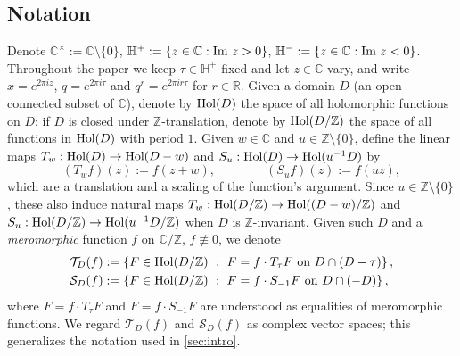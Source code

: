 \documentclass[reqno,11pt]{amsart}
\theoremstyle{definition}
\theoremstyle{remark}
\numberwithin{equation}{section}
\newcommand{\Z}{\mathbb{Z}}
\newcommand{\R}{\mathbb{R}}
\newcommand{\C}{\mathbb{C}}
\renewcommand{\H}{{\mathbb{H}}}
\newcommand{\mT}{\mathcal{T}}
\newcommand{\mS}{\mathcal{S}}
\renewcommand{\Im}{\textnormal{Im}\ }
\newcommand{\Hol}{\textnormal{Hol}}
\begin{document}
\subsection{Notation} \label{subsec:notation}
Denote $\C^\times := \C \setminus \{0\}$, $\H^+ := \{z \in \C : \Im z > 0\}$, $\H^- := \{z \in \C : \Im z < 0\}$. Throughout the paper we keep $\tau \in \H^+$ fixed and let $z \in \C$ vary, and write $x = e^{2\pi i z}$, $q = e^{2\pi i \tau}$ and $q^r = e^{2\pi i r \tau}$ for $r \in \R$. Given a domain $D$ (an open connected subset of $\C$), denote by $\Hol(D)$ the space of all holomorphic functions on $D$; if $D$ is closed under $\Z$-translation, denote by $\Hol(D/\Z)$ the space of all functions in $\Hol(D)$ with period $1$. Given $w \in \C$ and $u \in \Z \setminus \{0\}$, define the linear maps $T_w : \Hol(D) \to \Hol(D - w)$ and $S_u : \Hol(D) \to \Hol(u^{-1} D)$ by
\[
    (T_w f)(z) := f(z+w), \qquad\qquad (S_u f)(z) := f(u z),
\]
which are a translation and a scaling of the function's argument. Since $u \in \Z \setminus \{0\}$, these also induce natural maps $T_w : \Hol(D/\Z) \to \Hol((D-w)/\Z)$ and $S_u : \Hol(D/\Z) \to \Hol(u^{-1}D/\Z)$ when $D$ is $\Z$-invariant. Given such $D$ and a \emph{meromorphic} function $f$ on $\C/\Z$, $f \not\equiv 0$, we denote
\begin{align}
    \mT_D(f) &:= \left\{F \in \Hol(D/\Z)\ :\ F = f \cdot T_\tau F \text{ on } D \cap (D - \tau)\right\}, \label{eq:T-spaces} \\
    \mS_D(f) &:= \left\{F \in \Hol(D/\Z)\ :\ F = f \cdot S_{-1} F \text{ on } D \cap (-D)\right\}, \label{eq:S-spaces}
\end{align}
where $F = f \cdot T_\tau F$ and $F = f \cdot S_{-1}F$ are understood as equalities of meromorphic functions. We regard $\mT_D(f)$ and $\mS_D(f)$ as complex vector spaces; this generalizes the notation used in \cref{sec:intro}. 
\end{document}
